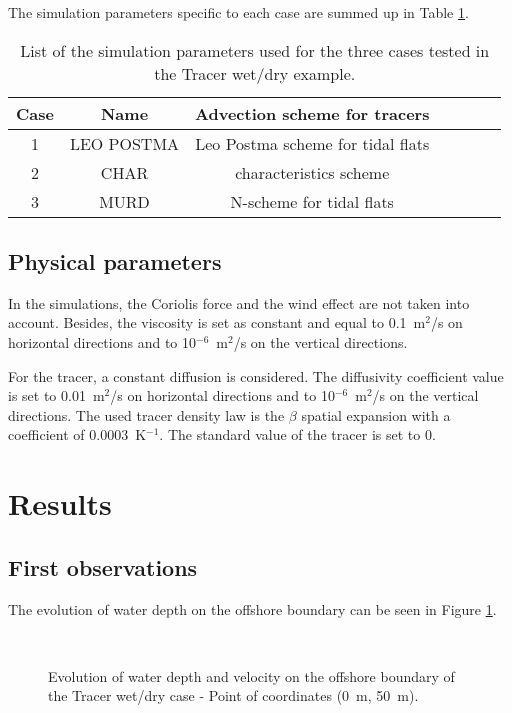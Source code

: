 The simulation parameters specific to each case are summed up in Table \ref{tab:tracerwetdry:cases}.
\begin{table}[H]
    \centering
    \begin{tabular}{|c|c|c|c|c|c|c|}
      \hline Case & Name & Advection scheme for tracers  \\
      \hline 1 & LEO POSTMA &  Leo Postma scheme for tidal flats \\
      \hline 2 & CHAR &  characteristics scheme \\
      \hline 3 & MURD & N-scheme for tidal flats \\
      \hline
    \end{tabular}
  \caption{List of the simulation parameters used for the three cases tested in the Tracer wet/dry example.}
  \label{tab:tracerwetdry:cases}
\end{table}

\subsection{Physical parameters}
In the simulations, the Coriolis force and the wind effect are not taken into account.
Besides, the viscosity is set as constant and equal to 0.1~m$^2$/s on
horizontal directions and to 10$^{-6}$~m$^2$/s on the vertical directions.

For the tracer, a constant diffusion is considered.  The diffusivity coefficient value
is set to 0.01~m$^2$/s on horizontal directions and to 10$^{-6}$~m$^2$/s on the vertical directions.
The used tracer density law is the $\beta$ spatial expansion with a coefficient
of 0.0003~K$^{-1}$. The standard value of the tracer is set to 0.

\section{Results}

\subsection{First observations}

The evolution of water depth on the offshore boundary can be seen in Figure \ref{fig:tracerwetdry:offshoreH}.

\begin{figure}[H]
  \centering
  \mbox{
  }
  \caption{Evolution of water depth and velocity on the offshore boundary of the Tracer wet/dry case - Point of coordinates (0~m, 50~m).}\label{fig:tracerwetdry:offshoreH}
\end{figure}

